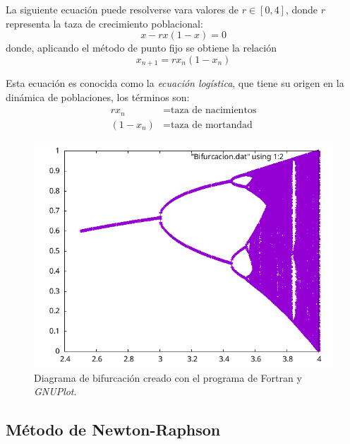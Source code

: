 \begin{ex}
    La siguiente ecuación puede resolverse vara valores de $r \in [0,4]$,
    donde $r$ representa la taza de crecimiento poblacional:
    \[
        x - rx(1 - x) = 0
    \]
    donde, aplicando el método de punto fijo se obtiene la relación
    \[
        x_{n+1} = r x_n (1 - x_n)
    \]

    Esta ecuación es conocida como la \emph{ecuación logística}, que tiene su
    origen en la dinámica de poblaciones, los términos son:
    \begin{align*}
        rx_n &= \text{taza de nacimientos} \\
        (1 - x_n) &= \text{taza de mortandad}
    \end{align*}

    

    \begin{figure}
        \centering
        \includegraphics[width=1.0\textwidth]{programas/bifurcacion/bifurcacion.png}
        \caption{Diagrama de bifurcación creado con el programa de
        Fortran y \textit{GNUPlot}.}
    \end{figure}
\end{ex}

\subsection{Método de Newton-Raphson}


